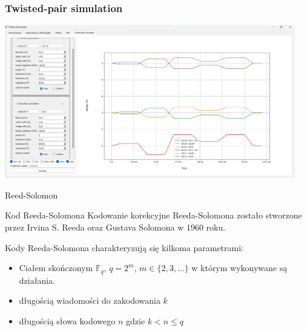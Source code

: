 \documentclass{beamer}
\begin{document}
\begin{frame}
    \frametitle{Twisted-pair simulation}
    \begin{center}
        \includegraphics[width=0.95\textwidth, height=0.85\textheight,keepaspectratio]{prezentacja_tp.png}
    \end{center}
\end{frame}



\begin{frame}{Reed-Solomon}
	\begin{exampleblock}{Kod Reeda-Solomona}
		Kodowanie korekcyjne Reeda-Solomona zostało stworzone przez Irvina S. Reeda	oraz Gustava Solomona w 1960 roku.

		Kody Reeda-Solomona charakteryzują się kilkoma parametrami:

		\begin{itemize}
			\item Ciałem skończonym $\mathbb{F}_{q}$,  $q=2^m$, $m \in \{ 2, 3, \ldots \}$ w którym wykonywane są działania.
			\item długością wiadomości do zakodowania $k$
			\item długością słowa kodowego $n$ gdzie $k < n \leq q$
		\end{itemize}
	\end{exampleblock}
\end{frame}
\end{document}
